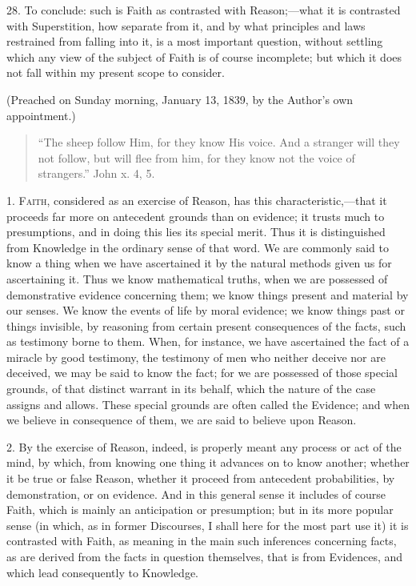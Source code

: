28. To conclude: such is Faith as contrasted with Reason;—what it
is contrasted with Superstition, how separate from it, and by what
principles and laws restrained from falling into it, is a most
important question, without settling which any view of the subject of
Faith is of course incomplete; but which it does not fall within my
present scope to consider.

(Preached on Sunday morning, January 13, 1839, by the Author's own
appointment.)


\begin{quote}

``The sheep follow Him, for they know His voice. And a
stranger will they not follow, but will flee from him, for they know
not the voice of strangers.'' John x. 4, 5.

\end{quote}

1. F\textsc{aith}, considered as an exercise of Reason, has this
characteristic,—that it proceeds far more on antecedent grounds than
on evidence; it trusts much to presumptions, and in doing this lies
its special merit. Thus it is distinguished from Knowledge in the
ordinary sense of that word. We are commonly said to know a thing when
we have ascertained it by the natural methods given us for
ascertaining it. Thus we know mathematical truths, when we are
possessed of demonstrative evidence concerning them; we know things
present and material by our senses. We know the events of life by
moral evidence; we know things past or things invisible, by reasoning
from certain present consequences of the facts, such as testimony
borne to them. When, for instance, we have ascertained the fact of a
miracle by good testimony, the testimony of men who neither deceive
nor are deceived, we may be said to know the fact; for we are
possessed of those special grounds, of that distinct warrant in its
behalf, which the nature of the case assigns and allows. These special
grounds are often called the Evidence; and when we believe in
consequence of them, we are said to believe upon Reason.

2. By the exercise of Reason, indeed, is properly meant any process
or act of the mind, by which, from knowing one thing it advances on to
know another; whether it be true or false Reason, whether it proceed
from antecedent probabilities, by demonstration, or on evidence. And
in this general sense it includes of course Faith, which is mainly an
anticipation or presumption; but in its more popular sense (in which,
as in former Discourses, I shall here for the most part use it) it is
contrasted with Faith, as meaning in the main such inferences
concerning facts, as are derived from the facts in question
themselves, that is from Evidences, and which lead consequently to
Knowledge.

